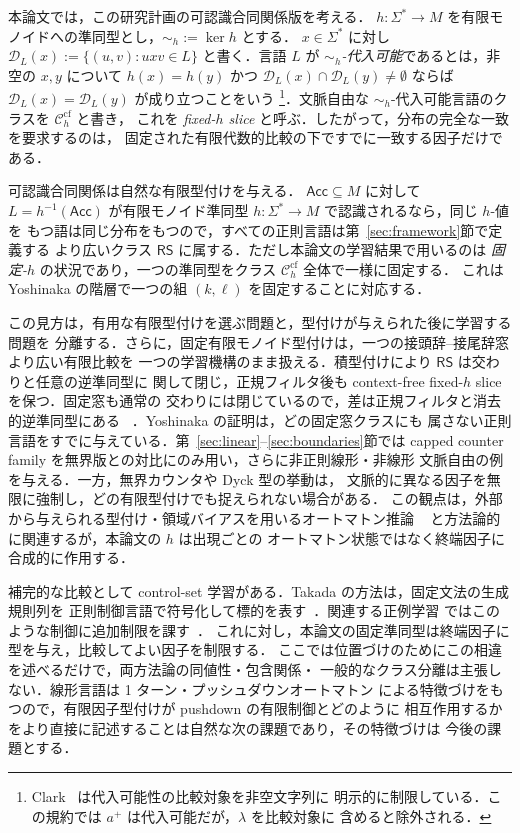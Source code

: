 \documentclass[11pt,a4paper]{ltjsarticle}
\theoremstyle{remark}
\theoremstyle{plain}
\newcommand{\D}{\mathcal{D}}
\newcommand{\cf}{\mathrm{cf}}
\newcommand{\Ccf}[1]{\mathcal C_{#1}^{\cf}}
\begin{document}
本論文では，この研究計画の可認識合同関係版を考える．
$h:\Sigma^*\to M$ を有限モノイドへの準同型とし，$\sim_h:=\ker h$ とする．
$x\in\Sigma^*$ に対し
$\D_L(x):=\{(u,v):uxv\in L\}$
と書く．言語 $L$ が \emph{$\sim_h$-代入可能}であるとは，非空の $x,y$ について
$h(x)=h(y)$ かつ $\D_L(x)\cap\D_L(y)\ne\emptyset$ ならば
$\D_L(x)=\D_L(y)$ が成り立つことをいう%
\footnote{Clark~\cite{clark2013} は代入可能性の比較対象を非空文字列に
明示的に制限している．この規約では $a^+$ は代入可能だが，$\lambda$ を比較対象に
含めると除外される．}．文脈自由な $\sim_h$-代入可能言語のクラスを $\Ccf{h}$ と書き，
これを \emph{fixed-$h$ slice} と呼ぶ．したがって，分布の完全な一致を要求するのは，
固定された有限代数的比較の下ですでに一致する因子だけである．

可認識合同関係は自然な有限型付けを与える．
$\mathsf{Acc}\subseteq M$ に対して $L=h^{-1}(\mathsf{Acc})$ が有限モノイド準同型 $h:\Sigma^*\to M$ で認識されるなら，同じ $h$-値を
もつ語は同じ分布をもつので，すべての正則言語は第~\ref{sec:framework}節で定義する
より広いクラス $\mathsf{RS}$ に属する．ただし本論文の学習結果で用いるのは
\emph{固定-$h$} の状況であり，一つの準同型をクラス $\Ccf{h}$ 全体で一様に固定する．
これは Yoshinaka の階層で一つの組 $(k,\ell)$ を固定することに対応する．

この見方は，有用な有限型付けを選ぶ問題と，型付けが与えられた後に学習する問題を
分離する．さらに，固定有限モノイド型付けは，一つの接頭辞--接尾辞窓より広い有限比較を
一つの学習機構のまま扱える．積型付けにより $\mathsf{RS}$ は交わりと任意の逆準同型に
関して閉じ，正規フィルタ後も context-free fixed-$h$ slice を保つ．固定窓も通常の
交わりには閉じているので，差は正規フィルタと消去的逆準同型にある
~\cite[Proposition~1]{yoshinaka2008}．Yoshinaka の証明は，どの固定窓クラスにも
属さない正則言語をすでに与えている．第~\ref{sec:linear}--\ref{sec:boundaries}節では
capped counter family を無界版との対比にのみ用い，さらに非正則線形・非線形
文脈自由の例を与える．一方，無界カウンタや Dyck 型の挙動は，
文脈的に異なる因子を無限に強制し，どの有限型付けでも捉えられない場合がある．
この観点は，外部から与えられる型付け・領域バイアスを用いるオートマトン推論
~\cite{coste-typing2004} と方法論的に関連するが，本論文の $h$ は出現ごとの
オートマトン状態ではなく終端因子に合成的に作用する．

補完的な比較として control-set 学習がある．Takada の方法は，固定文法の生成規則列を
正則制御言語で符号化して標的を表す~\cite{takada1988,takada1995}．関連する正例学習
ではこのような制御に追加制限を課す~\cite{koshiba-makinen-takada1997}．
これに対し，本論文の固定準同型は終端因子に型を与え，比較してよい因子を制限する．
ここでは位置づけのためにこの相違を述べるだけで，両方法論の同値性・包含関係・
一般的なクラス分離は主張しない．線形言語は 1 ターン・プッシュダウンオートマトン
による特徴づけをもつので，有限因子型付けが pushdown の有限制御とどのように
相互作用するかをより直接に記述することは自然な次の課題であり，その特徴づけは
今後の課題とする．
\end{document}
